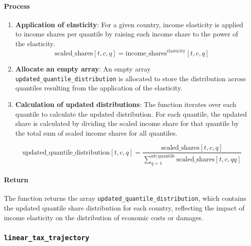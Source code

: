 \documentclass[
]{article}
\providecommand{\tightlist}{%
  \setlength{\itemsep}{0pt}\setlength{\parskip}{0pt}}
\begin{document}
\paragraph{Process}\label{process}

\begin{enumerate}
\def\labelenumi{\arabic{enumi}.}
\tightlist
\item
  \textbf{Application of elasticity}: For a given country, income elasticity is applied to
  income shares per quantile by raising each income share to the power
  of the elasticity.
  \begin{equation} 
    \text{scaled\_shares}[t,c,q] = \text{income\_shares}^{\text{elasticity}}[t,c,q] 
  \end{equation}
\item
  \textbf{Allocate an empty array}: An empty array \texttt{updated\_quantile\_distribution} is allocated to store
  the distribution across quantiles resulting from the application of
  the elasticity.
\item
  \textbf{Calculation of updated distributions}: The function iterates
  over each quantile to calculate the updated distribution. For each
  quantile, the updated share is calculated by dividing the scaled
  income share for that quantile by the total sum of scaled income
  shares for all quantiles.

  \begin{equation} 
    \text{updated\_quantile\_distribution}[t,c,q] = \frac{\text{scaled\_shares}[t,c,q]}{\sum_{q=1}^{\text{nb\_quantile}} \text{scaled\_shares}[t,c,qq]} 
  \end{equation}
\end{enumerate}

\paragraph{Return}\label{return-1}

The function returns the array \texttt{updated\_quantile\_distribution},
which contains the updated quantile share distribution for each country,
reflecting the impact of income elasticity on the distribution of
economic costs or damages.

\subsubsection{\texorpdfstring{\texttt{linear\_tax\_trajectory}}{Linear\_tax\_trajectory}}\label{linear_tax_trajectory}
\end{document}
